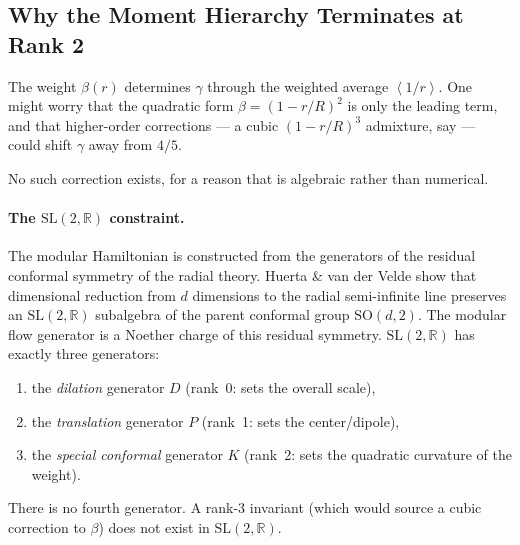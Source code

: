 \documentclass[11pt,letterpaper]{article}
\newcommand{\av}[1]{\left\langle #1 \right\rangle}
\begin{document}
\subsection{Why the Moment Hierarchy Terminates at Rank 2}
\label{sec:moment_hierarchy}

The weight $\beta(r)$ determines $\gamma$ through the weighted average
$\av{1/r}$. One might worry that the quadratic form $\beta = (1-r/R)^2$ is only
the leading term, and that higher-order corrections --- a cubic
$(1-r/R)^3$ admixture, say --- could shift $\gamma$ away from $4/5$.

No such correction exists, for a reason that is algebraic rather than
numerical.

\paragraph{The $\mathrm{SL}(2,\mathbb{R})$ constraint.}
The modular Hamiltonian is constructed from the generators of the
residual conformal symmetry of the radial theory. Huerta \& van der Velde
show that dimensional reduction from $d$ dimensions to the radial
semi-infinite line preserves an $\mathrm{SL}(2,\mathbb{R})$ subalgebra of the
parent conformal group $\mathrm{SO}(d,2)$. The modular flow generator is a
Noether charge of this residual symmetry. $\mathrm{SL}(2,\mathbb{R})$ has
exactly three generators:
\begin{enumerate}
  \item the \emph{dilation} generator $D$ (rank~0: sets the overall scale),
  \item the \emph{translation} generator $P$ (rank~1: sets the center/dipole),
  \item the \emph{special conformal} generator $K$ (rank~2: sets the
    quadratic curvature of the weight).
\end{enumerate}
There is no fourth generator. A rank-3 invariant (which would source a
cubic correction to $\beta$) does not exist in $\mathrm{SL}(2,\mathbb{R})$.
\end{document}
